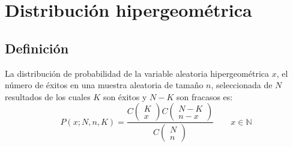 \section{Distribución hipergeométrica}
\subsection{Definición}
La distribución de probabilidad de la variable aleatoria hipergeométrica $x$, el número de éxitos en una muestra aleatoria de tamaño $n$, seleccionada de $N$ resultados de los cuales $K$ son éxitos y $N-K$ son fracasos es:
\begin{equation}
    P(x;N,n,K) = \frac{C\left(\begin{matrix}
            K \\
            x
        \end{matrix}\right)C\left(\begin{matrix}
            N-K \\
            n-x
        \end{matrix}\right)}{C\left(\begin{matrix}
            N \\
            n
        \end{matrix}\right)} \qquad x \in \mathbb{N}
\end{equation}
